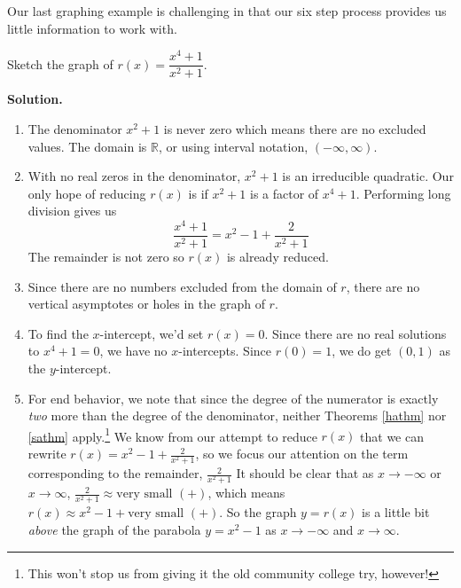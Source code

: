 \documentclass{ximera}
\begin{document}
Our last graphing example is challenging in that our six step process provides us little information to work with.

\begin{ex}   \label{carefulanalysisneeded} Sketch the graph of $r(x) = \dfrac{x^4+1}{x^2+1}$.

\smallskip

{\bf Solution.}

\begin{enumerate}

\item  The denominator $x^2+1$ is never zero which means there are no excluded values.  The domain is $\mathbb{R}$, or using interval notation,  $(-\infty, \infty)$.

\item  With no real zeros in the denominator, $x^2+1$ is an irreducible quadratic.  Our only hope of reducing $r(x)$ is if $x^2+1$ is a factor of $x^4+1$.  Performing long division gives us \[\frac{x^4+1}{x^2+1} = x^2-1+\frac{2}{x^2+1}\] The remainder is not zero so $r(x)$ is already reduced.

\item Since there are no numbers excluded from the domain of $r$, there are no vertical asymptotes or holes in the graph of $r$.

\item  To find the $x$-intercept, we'd set $r(x) = 0$.  Since there are no real solutions to $x^4+1=0$, we have no $x$-intercepts.  Since $r(0) = 1$, we do get $(0,1)$ as the $y$-intercept.

\item  For end behavior, we note that since the degree of the numerator is exactly \textit{two} more than the degree of the denominator, neither Theorems \ref{hathm} nor \ref{sathm} apply.\footnote{This won't stop us from giving it the old community college try, however!} We know from our attempt to reduce $r(x)$ that we can rewrite $r(x) = x^2-1+\frac{2}{x^2+1}$, so we focus our attention on the term corresponding to the remainder, $\frac{2}{x^2+1}$  It should be clear that as $x \rightarrow - \infty$ or $x \rightarrow \infty$, $\frac{2}{x^2+1} \approx \text{very small $(+)$}$, which means $r(x) \approx x^2-1 + \text{very small $(+)$}$.  So the graph $y=r(x)$ is a little bit \textit{above} the graph of the parabola $y=x^2-1$ as $x \rightarrow  -\infty$ and $x \rightarrow \infty$. 



\end{enumerate}
\end{ex}
\end{document}
